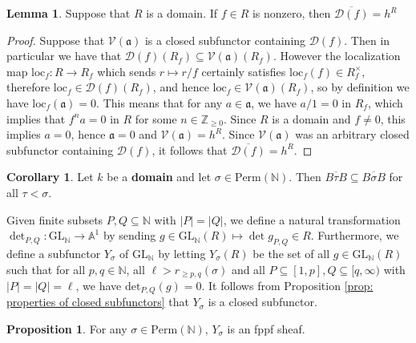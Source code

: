 \documentclass[oneside,11pt]{amsart}
\newcommand{\zz}{\ensuremath{\mathbb{Z}}}
\newcommand{\nn}{\ensuremath{\mathbb{N}}}
\newcommand{\aaa}{\ensuremath{\mathbb{A}}}
\newcommand{\mD}{\ensuremath{\mathcal{D}}}
\newcommand{\mV}{\ensuremath{\mathcal{V}}}
\newcommand{\fa}{\ensuremath{\mathfrak{a}}}
\newcommand{\loc}{\ensuremath{\text{loc}}}
\newcommand{\GL}{\ensuremath{\text{GL}}}
\newcommand{\Perm}{\ensuremath{\text{Perm}}}
\theoremstyle{definition}
\newtheorem{proof techniques}{Proof Techniques}
\newtheorem{lemma}{Lemma}
\newtheorem{corollary}{Corollary}
\newtheorem{proposition}{Proposition}
\begin{document}
\begin{lemma}\label{lem: closure of basic affine open is the whole spectrum for domains}
Suppose that $R$ is a domain. If $f \in R$ is nonzero, then $\overline{\mD(f)} = h^R$

\end{lemma}

\begin{proof}
Suppose that $\mV(\fa)$ is a closed subfunctor containing $\mD(f)$. Then in particular we have that $\mD(f)(R_f) \subseteq \mV(\fa)(R_f)$. However the localization map $\loc_f : R \to R_f$ which sends $r \mapsto r/f$ certainly satisfies $\loc_f(f) \in R_f^\times$, therefore $\loc_f \in \mD(f)(R_f)$, and hence $\loc_f \in \mV(\fa)(R_f)$, so by definition we have $\loc_f(\fa) = 0$. This means that for any $a \in \fa$, we have $a / 1 = 0$ in $R_f$, which implies that $f^n a = 0$ in $R$ for some $n \in \zz_{\geq 0}$. Since $R$ is a domain and $f \neq 0$, this implies $a = 0$, hence $\fa = 0$ and $\mV(\fa) = h^R$. Since $\mV(\fa)$ was an arbitrary closed subfunctor containing $\mD(f)$, it follows that $\overline{\mD(f)} = h^R$. 

\end{proof}

\begin{corollary}\label{cor: containment of the closure of schubert cells}
Let $k$ be a \textbf{domain} and let $\sigma \in \Perm(\nn)$. Then $\overline{B \tau B} \subseteq \overline{B\sigma B}$ for all $\tau < \sigma$. 
\end{corollary}


Given finite subsets $P , Q \subseteq \nn$ with $|P| = |Q|$, we define a natural transformation $\det_{P , Q} : \GL_\nn \to \aaa^1$ by sending $g \in \GL_\nn(R) \mapsto \det g_{P , Q} \in R$. Furthermore, we define a subfunctor $Y_\sigma$ of $\GL_\nn$ by letting $Y_\sigma(R)$ be the set of all $g \in \GL_\nn(R)$ such that for all $p , q \in \nn$, all $\ell > r_{\geq p , q}(\sigma)$ and all $P \subseteq [1 , p], Q \subseteq [q , \infty)$ with $|P| = |Q| = \ell$, we have $\text{det}_{P , Q} (g) = 0$. It follows from Proposition \ref{prop: properties of closed subfunctors} that $Y_\sigma$ is a closed subfunctor. 


\begin{proposition}
For any $\sigma \in \Perm(\nn)$, $Y_\sigma$ is an fppf sheaf.
\end{proposition}
\end{document}
